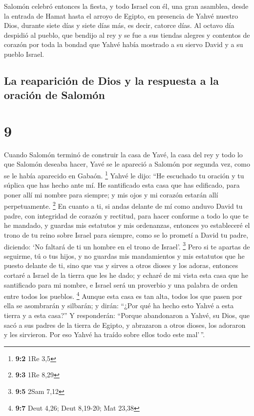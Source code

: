  Salomón celebró entonces la fiesta, y todo Israel con
él, una gran asamblea, desde la entrada de Hamat hasta el arroyo de
Egipto, en presencia de Yahvé nuestro Dios, durante siete días y siete
días más, es decir, catorce días.  Al octavo día despidió
al pueblo, que bendijo al rey y se fue a sus tiendas alegres y contentos
de corazón por toda la bondad que Yahvé había mostrado a su siervo David
y a su pueblo Israel.

\hypertarget{la-reapariciuxf3n-de-dios-y-la-respuesta-a-la-oraciuxf3n-de-salomuxf3n}{%
\subsection{La reaparición de Dios y la respuesta a la oración de
Salomón}\label{la-reapariciuxf3n-de-dios-y-la-respuesta-a-la-oraciuxf3n-de-salomuxf3n}}

\hypertarget{section-8}{%
\section{9}\label{section-8}}

 Cuando Salomón terminó de construir la casa de Yavé, la
casa del rey y todo lo que Salomón deseaba hacer,  Yavé se
le apareció a Salomón por segunda vez, como se le había aparecido en
Gabaón. \footnote{\textbf{9:2} 1Re 3,5}  Yahvé le dijo:
``He escuchado tu oración y tu súplica que has hecho ante mí. He
santificado esta casa que has edificado, para poner allí mi nombre para
siempre; y mis ojos y mi corazón estarán allí perpetuamente. \footnote{\textbf{9:3}
  1Re 8,29}  En cuanto a ti, si andas delante de mí como
anduvo David tu padre, con integridad de corazón y rectitud, para hacer
conforme a todo lo que te he mandado, y guardas mis estatutos y mis
ordenanzas,  entonces yo estableceré el trono de tu reino
sobre Israel para siempre, como se lo prometí a David tu padre,
diciendo: `No faltará de ti un hombre en el trono de Israel'.
\footnote{\textbf{9:5} 2Sam 7,12}  Pero si te apartas de
seguirme, tú o tus hijos, y no guardas mis mandamientos y mis estatutos
que he puesto delante de ti, sino que vas y sirves a otros dioses y los
adoras,  entonces cortaré a Israel de la tierra que les he
dado; y echaré de mi vista esta casa que he santificado para mi nombre,
e Israel será un proverbio y una palabra de orden entre todos los
pueblos. \footnote{\textbf{9:7} Deut 4,26; Deut 8,19-20; Mat 23,38}
 Aunque esta casa es tan alta, todos los que pasen por
ella se asombrarán y silbarán; y dirán: ``¿Por qué ha hecho esto Yahvé a
esta tierra y a esta casa?''  Y responderán: ``Porque
abandonaron a Yahvé, su Dios, que sacó a sus padres de la tierra de
Egipto, y abrazaron a otros dioses, los adoraron y les sirvieron. Por
eso Yahvé ha traído sobre ellos todo este mal'\,''.

